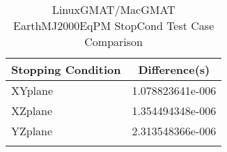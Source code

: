 \begin{table}[htbp!]
\centering
\caption{ LinuxGMAT/MacGMAT EarthMJ2000EqPM StopCond Test Case Comparison}
      \begin{tabular}{lc}
      \hline\hline
          Stopping Condition & Difference(s) \\
         \hline
         XYplane & 1.078823641e-006 \\
         XZplane & 1.354494348e-006 \\
         YZplane & 2.313548366e-006 \\
      \hline\hline
      \label{Table: LinuxGMAT-MacGMAT EarthMJ2000EqPM StopCond Table} 
\end{tabular}
\end{table}

